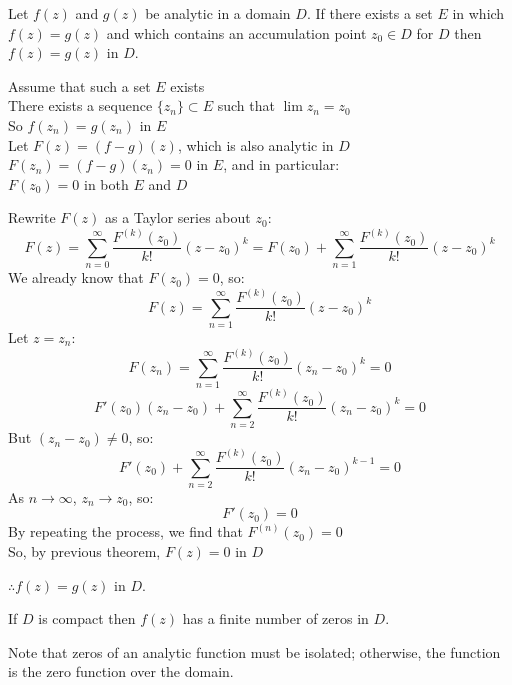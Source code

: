 \documentclass[letterpaper,12pt,fleqn]{article}
\begin{document}
\begin{theorem}[Uniqueness]
  Let $f(z)$ and $g(z)$ be analytic in a domain $D$. If there exists a set
  $E$ in which $f(z)=g(z)$ and which contains an accumulation point $z_0\in D$
  for $D$ then $f(z)=g(z)$ in $D$.
\end{theorem}

\begin{theproof}
  Assume that such a set $E$ exists \\
  There exists a sequence $\{z_n\}\subset E$ such that $\lim{z_n}=z_0$ \\
  So $f(z_n)=g(z_n)$ in $E$ \\
  Let $F(z)=(f-g)(z)$, which is also analytic in $D$ \\
  $F(z_n)=(f-g)(z_n)=0$ in $E$, and in particular: \\
  $F(z_0)=0$ in both $E$ and $D$

  Rewrite $F(z)$ as a Taylor series about $z_0$:
  \[F(z)=\sum_{n=0}^{\infty}\frac{F^{(k)}(z_0)}{k!}(z-z_0)^k=
  F(z_0)+\sum_{n=1}^{\infty}\frac{F^{(k)}(z_0)}{k!}(z-z_0)^k\]
  We already know that $F(z_0)=0$, so:
  \[F(z)=\sum_{n=1}^{\infty}\frac{F^{(k)}(z_0)}{k!}(z-z_0)^k\]
  Let $z=z_n$:
  \[F(z_n)=\sum_{n=1}^{\infty}\frac{F^{(k)}(z_0)}{k!}(z_n-z_0)^k=0\]
  \[F'(z_0)(z_n-z_0)+\sum_{n=2}^{\infty}\frac{F^{(k)}(z_0)}{k!}(z_n-z_0)^k=0\]
  But $(z_n-z_0)\ne0$, so:
  \[F'(z_0)+\sum_{n=2}^{\infty}\frac{F^{(k)}(z_0)}{k!}(z_n-z_0)^{k-1}=0\]
  As $n\to\infty$, $z_n\to z_0$, so:
  \[F'(z_0)=0\]
  By repeating the process, we find that $F^{(n)}(z_0)=0$ \\
  So, by previous theorem, $F(z)=0$ in $D$
  
  $\therefore f(z)=g(z)$ in $D$.
\end{theproof}

\begin{corollary}
  If $D$ is compact then $f(z)$ has a finite number of zeros in $D$.
\end{corollary}

Note that zeros of an analytic function must be isolated; otherwise, the
function is the zero function over the domain.
\end{document}
